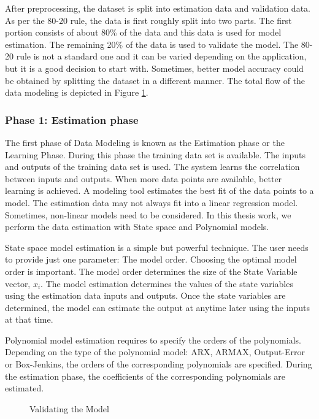 \documentclass[article,type=msc,colorback,12pt,accentcolor=tud8b,table]{tudthesis}
\begin{document}
 	After preprocessing, the dataset is split into estimation data and validation data. As per the 80-20 rule, the data is first roughly split into two parts. The first portion consists of about 80\% of the data and this data is used for model estimation. The remaining 20\% of the data is used to validate the model. The 80-20 rule is not a standard one and it can be varied depending on the application, but it is a good decision to start with. Sometimes, better model accuracy could be obtained by splitting the dataset in a different manner. The total flow of the data modeling is depicted in Figure \ref{fig:data_modeling_flowchart}.
 	
 	\subsubsection{Phase 1: Estimation phase}
 	
 	The first phase of Data Modeling is known as the Estimation phase or the Learning Phase. During this phase the training data set is available. The inputs and outputs of the training data set is used. The system learns the correlation between inputs and outputs. When more data points are available, better learning is achieved. A modeling tool estimates the best fit of the data points to a model. The estimation data may not always fit into a linear regression model. Sometimes, non-linear models need to be considered. In this thesis work, we perform the data estimation with State space and Polynomial models.
 	
 	State space model estimation is a simple but powerful technique. The user needs to provide just one parameter: The model order. Choosing the optimal model order is important. The model order determines the size of the State Variable vector, $x_i$. The model estimation determines the values of the state variables using the estimation data inputs and outputs. Once the state variables are determined, the model can estimate the output at anytime later using the inputs at that time.

Polynomial model estimation requires to specify the orders of the polynomials. Depending on the type of the polynomial model: ARX, ARMAX, Output-Error or Box-Jenkins,  the orders of the corresponding polynomials are specified. During the estimation phase, the coefficients of the corresponding polynomials are estimated.

\begin{figure}[H]
	\begin{center}
		\makebox[\textwidth]{\texttt{[image: C8]}}
	\end{center}
	\caption{Validating the Model}
	\label{fig:data_modeling_flowchart}
\end{figure}
  
\end{document}
